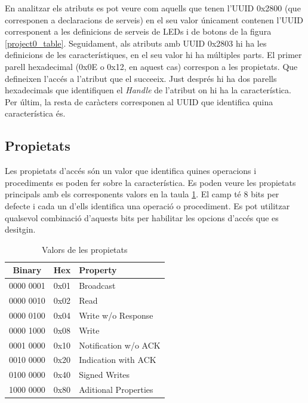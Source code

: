 En analitzar els atributs es pot veure com aquells que tenen l'UUID 0x2800 (que corresponen a declaracions de serveis) en el seu valor únicament contenen l'UUID corresponent a les definicions de serveis de LEDs i de botons de la figura \ref{project0_table}.
Seguidament, als atributs amb UUID 0x2803 hi ha les definicions de les característiques, en el seu valor hi ha múltiples parts.
El primer parell hexadecimal (0x0E o 0x12, en aquest cas) correspon a les propietats.
Que defineixen l'accés a l'atribut que el succeeix.
Just després hi ha dos parells hexadecimals que identifiquen el \textit{Handle} de l'atribut on hi ha la característica.
Per últim, la resta de caràcters corresponen al UUID que identifica quina característica és.

\subsection{Propietats}
\label{sec:properties}
Les propietats d'accés són un valor que identifica quines operacions i procediments es poden fer sobre la característica.
Es poden veure les propietats principals amb els corresponents valors en la taula \ref{properties}.
El camp té 8 bits per defecte i cada un d'ells identifica una operació o procediment.
Es pot utilitzar qualsevol combinació d'aquests bits  per habilitar les opcions d'accés que es desitgin.

\begin{table}[h]
	\begin{center}
		\begin{tabular}{|c|c|l|}
			\hline
			Binary	&	Hex		&	Property	\\	\hline
			0000 0001	&	0x01	&	Broadcast\\	\hline
			0000 0010	&	0x02	&	Read	\\	\hline
			0000 0100	&	0x04	&	Write w/o Response	\\	\hline
			0000 1000	&	0x08	&	Write	\\	\hline
			0001 0000	&	0x10	&	Notification w/o ACK	\\	\hline
			0010 0000	&	0x20	&	Indication with ACK	\\	\hline
			0100 0000	&	0x40	&	Signed Writes	\\	\hline
			1000 0000	&	0x80	&	Aditional Properties	\\	\hline
		\end{tabular}		
	\end{center}
\caption{Valors de les propietats}
\label{properties}
\end{table}

